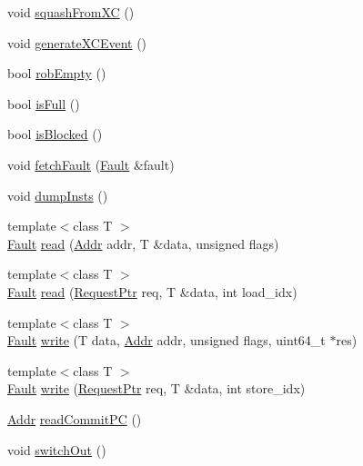 \begin{DoxyCompactItemize}
void \hyperlink{classInorderBackEnd_a647eb6c891733b0ef3d9233af7f15748}{squashFromXC} ()
\item 
void \hyperlink{classInorderBackEnd_ae4e704602e6cab77b5b96396fee5d104}{generateXCEvent} ()
\item 
bool \hyperlink{classInorderBackEnd_a5c38df1621043861ada4dd0939509869}{robEmpty} ()
\item 
bool \hyperlink{classInorderBackEnd_a3e70330939fdfc4dbc2f60c1a660584d}{isFull} ()
\item 
bool \hyperlink{classInorderBackEnd_ae6ec007d68382eb124ed25bc90ae9c17}{isBlocked} ()
\item 
void \hyperlink{classInorderBackEnd_a71dcc69e5b01fa12b8ccd2dccdcc9917}{fetchFault} (\hyperlink{classRefCountingPtr}{Fault} \&fault)
\item 
void \hyperlink{classInorderBackEnd_a80587b4fe043bbe1995536cb3b361588}{dumpInsts} ()
\item 
{\footnotesize template$<$class T $>$ }\\\hyperlink{classRefCountingPtr}{Fault} \hyperlink{classInorderBackEnd_a54c0093df1bc3e8cd4f00246884389cc}{read} (\hyperlink{base_2types_8hh_af1bb03d6a4ee096394a6749f0a169232}{Addr} addr, T \&data, unsigned flags)
\item 
{\footnotesize template$<$class T $>$ }\\\hyperlink{classRefCountingPtr}{Fault} \hyperlink{classInorderBackEnd_a0747777ac998dabdc20fa0c554d378d3}{read} (\hyperlink{classRequest}{RequestPtr} req, T \&data, int load\_\-idx)
\item 
{\footnotesize template$<$class T $>$ }\\\hyperlink{classRefCountingPtr}{Fault} \hyperlink{classInorderBackEnd_ace3a2a0aed65c3714979fca6f51276f9}{write} (T data, \hyperlink{base_2types_8hh_af1bb03d6a4ee096394a6749f0a169232}{Addr} addr, unsigned flags, uint64\_\-t $\ast$res)
\item 
{\footnotesize template$<$class T $>$ }\\\hyperlink{classRefCountingPtr}{Fault} \hyperlink{classInorderBackEnd_abbf7bcc93511421a1787650a43e2642a}{write} (\hyperlink{classRequest}{RequestPtr} req, T \&data, int store\_\-idx)
\item 
\hyperlink{base_2types_8hh_af1bb03d6a4ee096394a6749f0a169232}{Addr} \hyperlink{classInorderBackEnd_aa28f3fe58fde4b038a92b9f87a40cb10}{readCommitPC} ()
\item 
void \hyperlink{classInorderBackEnd_a05f299b443f8cc73a93d61572edc0218}{switchOut} ()
\item 

\end{DoxyCompactItemize}
